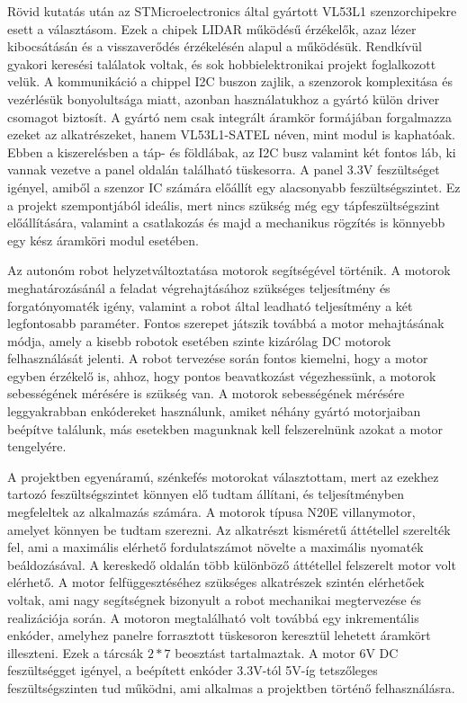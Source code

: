 Rövid kutatás után az STMicroelectronics által gyártott VL53L1 szenzorchipekre
esett a választásom. Ezek a chipek LIDAR működésű érzékelők, azaz lézer
kibocsátásán és a visszaverődés érzékelésén alapul a működésük. Rendkívül gyakori
keresési találatok voltak, és sok hobbielektronikai projekt foglalkozott velük. A
kommunikáció a chippel I2C buszon zajlik, a szenzorok komplexitása és vezérlésük
bonyolultsága miatt, azonban használatukhoz a gyártó külön driver csomagot
biztosít. A gyártó nem csak integrált áramkör formájában forgalmazza ezeket az
alkatrészeket, hanem VL53L1-SATEL néven, mint modul is kaphatóak. Ebben a
kiszerelésben a táp- és földlábak, az I2C busz valamint két fontos láb, ki vannak
vezetve a panel oldalán található tüskesorra.  A panel 3.3V feszültséget igényel,
amiből a szenzor IC számára előállít egy alacsonyabb feszültségszintet. Ez a
projekt szempontjából ideális, mert nincs szükség még egy tápfeszültségszint
előállítására, valamint a csatlakozás és majd a mechanikus rögzítés is könnyebb
egy kész áramköri modul esetében.


\medskip

Az autonóm robot helyzetváltoztatása motorok segítségével történik. A motorok
meghatározásánál a feladat végrehajtásához szükséges teljesítmény és
forgatónyomaték igény, valamint a robot által leadható teljesítmény a két
legfontosabb paraméter. Fontos szerepet játszik továbbá a motor mehajtásának
módja, amely a kisebb robotok esetében szinte kizárólag DC motorok felhasználását
jelenti. A robot tervezése során fontos kiemelni, hogy a motor egyben érzékelő
is, ahhoz, hogy pontos beavatkozást végezhessünk, a motorok sebességének mérésére
is szükség van. A motorok sebességének mérésére leggyakrabban enkódereket
használunk, amiket néhány gyártó motorjaiban beépítve találunk, más esetekben
magunknak kell felszerelnünk azokat a motor tengelyére.

A projektben egyenáramú, szénkefés motorokat választottam, mert az ezekhez
tartozó feszültségszintet könnyen elő tudtam állítani, és teljesítményben
megfeleltek az alkalmazás számára. A motorok típusa N20E villanymotor, amelyet
könnyen be tudtam szerezni. Az alkatrészt kisméretű áttétellel szerelték fel, ami
a maximális elérhető fordulatszámot növelte a maximális nyomaték beáldozásával. A
kereskedő oldalán több különböző áttétellel felszerelt motor volt elérhető.  A
motor felfüggesztéséhez szükséges alkatrészek szintén elérhetőek voltak, ami nagy
segítségnek bizonyult a robot mechanikai megtervezése és realizációja során. A
motoron megtalálható volt továbbá egy inkrementális enkóder, amelyhez panelre
forrasztott tüskesoron keresztül lehetett áramkört illeszteni. Ezek a tárcsák \(2
* 7\) beosztást tartalmaztak. A motor 6V DC feszültségget igényel, a beépített
enkóder 3.3V-tól 5V-íg tetszőleges feszültségszinten tud működni, ami alkalmas a
projektben történő felhasználásra.

